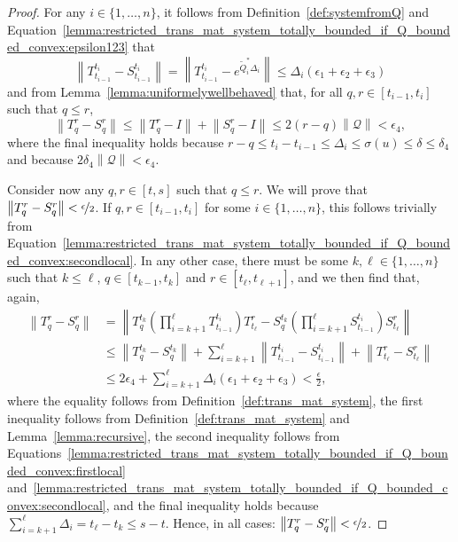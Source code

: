 \documentclass[10pt,a4paper]{paper}
\theoremstyle{definition}
\newcommand{\rateset}{\mathcal{Q}}
\newcommand{\norm}[1]{\left\lVert #1 \right\rVert}
\begin{document}
\begin{proof}
For any $i\in\{1,\dots,n\}$, it follows from Definition~\ref{def:systemfromQ} and Equation~\eqref{lemma:restricted_trans_mat_system_totally_bounded_if_Q_bounded_convex:epsilon123} that
\begin{equation}\label{lemma:restricted_trans_mat_system_totally_bounded_if_Q_bounded_convex:firstlocal}
\norm{T_{t_{i-1}}^{t_i} - S_{t_{i-1}}^{t_i}} 
=\norm{T_{t_{i-1}}^{t_i} - e^{\tilde{Q}_i^*\Delta_i}} 
\leq \Delta_i(\epsilon_1+\epsilon_2+\epsilon_3)
\end{equation}
and from Lemma~\ref{lemma:uniformelywellbehaved} that, for all $q,r\in[t_{i-1},t_i]$ such that $q\leq r$,
\begin{equation}\label{lemma:restricted_trans_mat_system_totally_bounded_if_Q_bounded_convex:secondlocal}
\norm{T_q^r - S_q^r} 
\leq
\norm{T_q^r - I}+\norm{S_q^r-I} 
\leq 2(r-q)\norm{\rateset}
<\epsilon_4,
\end{equation}
where the final inequality holds because $r-q\leq t_i-t_{i-1}\leq\Delta_i\leq\sigma(u)\leq\delta\leq\delta_4$ and because $2\delta_4\norm{\rateset}<\epsilon_4$.

Consider now any $q,r\in[t,s]$ such that $q\leq r$. We will prove that $\norm{T_q^r - S_q^r} < \nicefrac{\epsilon}{2}$. If $q,r\in[t_{i-1},t_i]$ for some $i\in\{1,\ldots,n\}$, this follows trivially from Equation~\eqref{lemma:restricted_trans_mat_system_totally_bounded_if_Q_bounded_convex:secondlocal}. In any other case, there must be some $k,\ell\in\{1,\ldots,n\}$ such that $k\leq\ell$, $q\in[t_{k-1},t_k]$ and $r\in[t_{\ell},t_{\ell+1}]$, and we then find that, again,
\begin{align*}
\norm{T_q^r - S_q^r} &= \norm{T_q^{t_k}\left(\prod_{i=k+1}^{\ell}T_{t_{i-1}}^{t_i}\right)T_{t_{\ell}}^r - S_q^{t_k}\left(\prod_{i=k+1}^{\ell}S_{t_{i-1}}^{t_i}\right)S_{t_{\ell}}^r} \\
&\leq
\norm{T_q^{t_k}-S_q^{t_k}}
+\sum_{i=k+1}^\ell\norm{T_{t_{i-1}}^{t_i}-S_{t_{i-1}}^{t_i}}
+\norm{T_{t_{\ell}}^r-S_{t_{\ell}}^r}\\
&\leq
2\epsilon_4+\sum_{i=k+1}^\ell\Delta_i(\epsilon_1+\epsilon_2+\epsilon_3)<\frac{\epsilon}{2},
\end{align*}
where the equality follows from Definition~\ref{def:trans_mat_system}, the first inequality follows from Definition~\ref{def:trans_mat_system} and Lemma~\ref{lemma:recursive}, the second inequality follows from Equations~\eqref{lemma:restricted_trans_mat_system_totally_bounded_if_Q_bounded_convex:firstlocal} and~\eqref{lemma:restricted_trans_mat_system_totally_bounded_if_Q_bounded_convex:secondlocal}, and the final inequality holds because $\sum_{i=k+1}^\ell\Delta_i=t_\ell-t_k\leq s-t$.
Hence, in all cases: $\norm{T_q^r - S_q^r} < \nicefrac{\epsilon}{2}$.


\end{proof}
\end{document}
